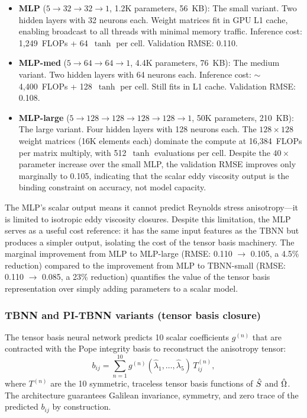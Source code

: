 \begin{itemize}
    \item \textbf{MLP} ($5 \to 32 \to 32 \to 1$, 1.2K parameters, \SI{56}{KB}): The small variant. Two hidden layers with 32 neurons each. Weight matrices fit in GPU L1 cache, enabling broadcast to all threads with minimal memory traffic. Inference cost: 1{,}249~FLOPs + 64~$\tanh$ per cell. Validation RMSE: 0.110.
    \item \textbf{MLP-med} ($5 \to 64 \to 64 \to 1$, 4.4K parameters, \SI{76}{KB}): The medium variant. Two hidden layers with 64 neurons each. Inference cost: $\sim$4{,}400~FLOPs + 128~$\tanh$ per cell. Still fits in L1 cache. Validation RMSE: 0.108.
    \item \textbf{MLP-large} ($5 \to 128 \to 128 \to 128 \to 128 \to 1$, 50K parameters, \SI{210}{KB}): The large variant. Four hidden layers with 128 neurons each. The $128 \times 128$ weight matrices (16K elements each) dominate the compute at 16{,}384~FLOPs per matrix multiply, with 512~$\tanh$ evaluations per cell. Despite the $40\times$ parameter increase over the small MLP, the validation RMSE improves only marginally to 0.105, indicating that the scalar eddy viscosity output is the binding constraint on accuracy, not model capacity.
\end{itemize}

The MLP's scalar output means it cannot predict Reynolds stress anisotropy---it is limited to isotropic eddy viscosity closures.
Despite this limitation, the MLP serves as a useful cost reference: it has the same input features as the TBNN but produces a simpler output, isolating the cost of the tensor basis machinery.
The marginal improvement from MLP to MLP-large (RMSE: 0.110 $\to$ 0.105, a 4.5\% reduction) compared to the improvement from MLP to TBNN-small (RMSE: 0.110 $\to$ 0.085, a 23\% reduction) quantifies the value of the tensor basis representation over simply adding parameters to a scalar model.

\subsubsection{TBNN and PI-TBNN variants (tensor basis closure)}
\label{sec:tbnn}

The tensor basis neural network \citep{Ling2016} predicts 10 scalar coefficients $g^{(n)}$ that are contracted with the Pope integrity basis \citep{Pope1975} to reconstruct the anisotropy tensor:
\begin{equation}
    b_{ij} = \sum_{n=1}^{10} g^{(n)}(\hat{\lambda}_1, \ldots, \hat{\lambda}_5) \, T^{(n)}_{ij},
    \label{eq:tbnn}
\end{equation}
where $T^{(n)}$ are the 10 symmetric, traceless tensor basis functions of $\hat{S}$ and $\hat{\Omega}$.
The architecture guarantees Galilean invariance, symmetry, and zero trace of the predicted $b_{ij}$ by construction.

